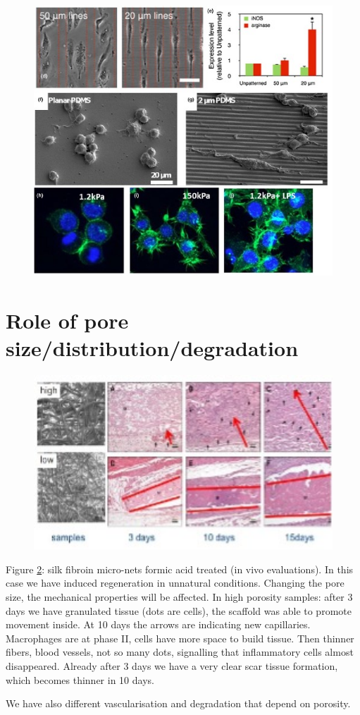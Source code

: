 \begin{figure}[h]
\includegraphics[width=1\textwidth]{topo}
\caption{\label{fig:topo}}
\end{figure}

\section{Role of pore size/distribution/degradation}
\begin{figure}[h]
\includegraphics[width=1\textwidth]{silk}
\caption{\label{fig:silk}}
\end{figure}

Figure \ref{fig:silk}: silk fibroin micro-nets formic acid treated (in vivo evaluations). 
In this case we have induced regeneration in unnatural conditions. 
Changing the pore size, the mechanical properties will be affected. In high porosity samples: after 3 days we have granulated tissue (dots are cells), the scaffold was able to promote movement inside. 
At 10 days the arrows are indicating new capillaries. 
Macrophages are at phase II, cells have more space to build tissue. 
Then thinner fibers, blood vessels, not so many dots, signalling that inflammatory cells almost disappeared. 
Already after 3 days we have a very clear scar tissue formation, which becomes thinner in 10 days. 

We have also different vascularisation and degradation that depend on porosity.
